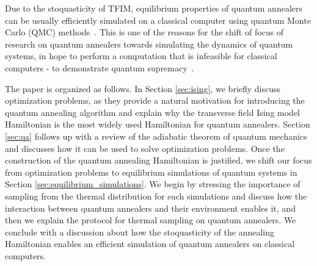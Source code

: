 \documentclass[12pt,a4paper]{article}
\begin{document}
\hspace*{0.3cm}
Due to the stoquasticity of TFIM, equilibrium properties of quantum annealers can be usually efficiently
simulated on a classical computer using quantum Monte Carlo (QMC) methods~\cite*{bravyi2006complexity}.
This is one of the reasons for the shift of focus of research on quantum annealers towards
simulating the dynamics of quantum systems, in hope to perform a computation that is infeasible for classical
computers - to demonstrate quantum supremacy~\cite*{king2024computational}.

\hspace*{0.3cm}
The paper is organized as follows. In Section \ref{sec:ising}, we briefly discuss optimization problems,
as they provide a natural motivation for introducing the quantum annealing algorithm and explain why the
transverse field Ising model Hamiltonian is the most widely used Hamiltonian for quantum annealers.
Section \ref{sec:qa} follows up with a review of the adiabatic theorem of quantum mechanics and discusses how it
can be used to solve optimization problems. Once the construction of the quantum annealing Hamiltonian is justified,
we shift our focus from optimization problems to equilibrium simulations of quantum systems in
Section \ref{sec:equilibrium_simulations}. We begin by stressing the importance of sampling
from the thermal distribution for such simulations and discuss how the interaction between quantum annealers
and their environment enables it, and then we explain the protocol
for thermal sampling on quantum annealers. We conclude with a discussion about
how the stoquasticity of the annealing Hamiltonian enables an efficient simulation of quantum annealers
on classical computers.
\end{document}
